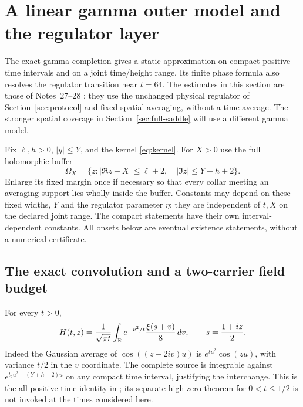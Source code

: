 \section{A linear gamma outer model and the regulator layer}\label{sec:gamma-outer}
The exact gamma completion gives a static approximation on compact
positive-time intervals and on a joint time/height range.  Its finite
phase formula also resolves the regulator transition near $t=64$.
The estimates in this section are those of Notes~27--28
\cite{n27,n28}; they use the unchanged physical regulator of
Section~\ref{sec:protocol} and fixed spatial averaging, without a time
average.  The stronger spatial coverage in Section~\ref{sec:full-saddle}
will use a different gamma model.

Fix $\ell,h>0$, $|y|\le Y$, and the kernel \eqref{eq:kernel}.
For $X>0$ use the full holomorphic buffer
\[
 \Omega_X=\{z:|\Re z-X|\le\ell+2,\quad |\Im z|\le Y+h+2\}.
\]
Enlarge its fixed margin once if necessary so that every collar meeting
an averaging support lies wholly inside the buffer.  Constants may
depend on these fixed widths, $Y$ and the regulator parameter $\eta$;
they are independent of $t,X$ on the declared joint range.  The compact
statements have their own interval-dependent constants.  All onsets below
are eventual existence statements, without a numerical certificate.

\subsection{The exact convolution and a two-carrier field budget}
For every $t>0$,
\begin{equation}
 H(t,z)=\frac1{\sqrt{\pi t}}\int_{\mathbb R}e^{-v^2/t}
                    \frac{\xi(s+v)}8\,dv,
 \qquad s=\frac{1+iz}{2}.
 \label{eq:xi-heat-convolution}
\end{equation}
Indeed the Gaussian average of $\cos((z-2iv)u)$ is
$e^{tu^2}\cos(zu)$, with variance $t/2$ in the $v$ coordinate.
The complete source is integrable against
$e^{t_bu^2+(Y+h+2)u}$ on any compact time interval, justifying the
interchange.  This is the all-positive-time identity in
\cite[Section~4, equation~(35)]{polymath2019heat}; its separate high-zero
theorem for $0<t\le1/2$ is not invoked at the times considered here.

